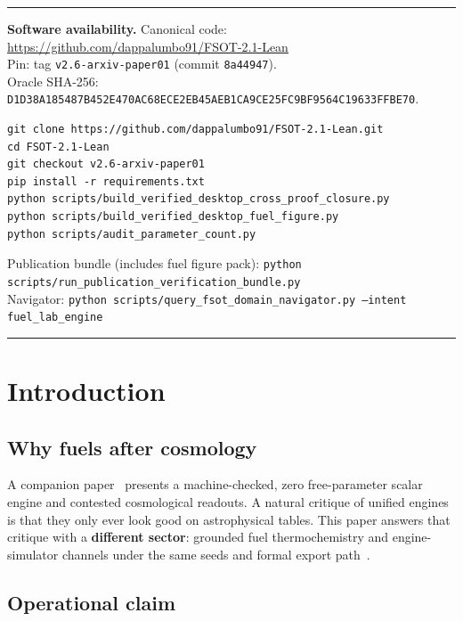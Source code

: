 \documentclass[11pt,a4paper]{article}
\begin{document}
\vspace{0.6em}
\noindent
\begin{center}
\begin{minipage}{0.95\linewidth}
\hrule\vspace{0.4em}
{\small
\textbf{Software availability.}
Canonical code: \url{https://github.com/dappalumbo91/FSOT-2.1-Lean}\\
Pin: tag \texttt{v2.6-arxiv-paper01} (commit \texttt{8a44947}).\\
Oracle SHA-256:
\texttt{D1D38A185487B452E470AC68ECE2EB45AEB1CA9CE25FC9BF9564C19633FFBE70}.
\begin{verbatim}
git clone https://github.com/dappalumbo91/FSOT-2.1-Lean.git
cd FSOT-2.1-Lean
git checkout v2.6-arxiv-paper01
pip install -r requirements.txt
python scripts/build_verified_desktop_cross_proof_closure.py
python scripts/build_verified_desktop_fuel_figure.py
python scripts/audit_parameter_count.py
\end{verbatim}
Publication bundle (includes fuel figure pack):
\texttt{python scripts/run\_publication\_verification\_bundle.py}\\
Navigator: \texttt{python scripts/query\_fsot\_domain\_navigator.py --intent fuel\_lab\_engine}
}
\vspace{0.4em}\hrule
\end{minipage}
\end{center}

\section{Introduction}
\label{sec:intro}

\subsection{Why fuels after cosmology}

A companion paper~\cite{FSOTPaper01} presents a machine-checked, zero
free-parameter scalar engine and contested cosmological readouts.
A natural critique of unified engines is that they only ever look good on
astrophysical tables.
This paper answers that critique with a \textbf{different sector}: grounded
fuel thermochemistry and engine-simulator channels under the same seeds and
formal export path~\cite{FSOT21Lean}.

\subsection{Operational claim}
\end{document}
